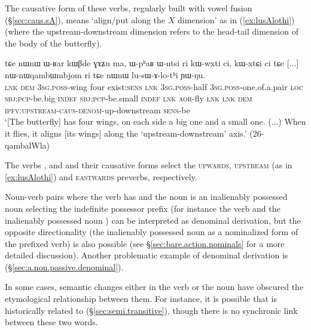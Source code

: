The causative form of these verbs, regularly built with vowel fusion   (§\ref{sec:caus.sA}), means `align/put along the $X$ dimension' as in (\ref{ex:lusAlothi}) (where the upstream-downstream dimension refers to the head-tail dimension of the body of the butterfly).

\begin{exe}
\ex \label{ex:lusAlothi}
\gll tɕe nɯnɯ ɯ-ʁar kɯβde ɣɤʑu ma, ɯ-pʰaʁ ɯ-ntsi ri kɯ-wxti ci, kɯ-xtɕi ci tɕe [...] nɯ-nɯqambɯmbjom ri tɕe nɯnɯ lu-sɯ-ɤ-lo-tʰi ɲɯ-ŋu. \\
\textsc{lnk} \textsc{dem} \textsc{3sg}.\textsc{poss}-wing four exist:\textsc{sens} \textsc{lnk} \textsc{3sg}.\textsc{poss}-half \textsc{3sg}.\textsc{poss}-one.of.a.pair \textsc{loc} \textsc{sbj}:\textsc{pcp}-be.big \textsc{indef} \textsc{sbj}:\textsc{pcp}-be.small \textsc{indef} \textsc{lnk} { }  \textsc{aor}-fly \textsc{lnk} \textsc{lnk} \textsc{dem} \textsc{ipfv}:\textsc{upstream}-\textsc{caus}-\textsc{denom}-up-downstream \textsc{sens}-be \\
\glt `[The butterfly] has four wings, on each side a big one and a small one. (...) When it flies, it aligns [its wings] along the `upstream-downstream' axis.' (26-qambalWla)
\end{exe}

The verbs ,  and  and their causative forms  select the \textsc{upwards}, \textsc{upstream} (as in \ref{ex:lusAlothi}) and \textsc{eastwards} preverbs, respectively.


Noun-verb pairs where the verb has  and the noun is an inalienably possessed noun selecting the  indefinite possessor prefix (for instance the verb  and the inalienably possessed noun  ) can be interpreted as  denominal derivation, but the opposite directionality (the inalienably possessed noun as a nominalized form of the  prefixed verb) is also possible (see §\ref{sec:bare.action.nominals} for a more detailed discussion). Another problematic example of  denominal derivation is  (§\ref{sec:a.non.passive.denominal}).

In some cases, semantic changes either in the verb or the noun have obscured the etymological relationship between them. For instance, it is possible that  is historically related to  (§\ref{sec:semi.transitive}), though there is no synchronic link between these two words.
 
